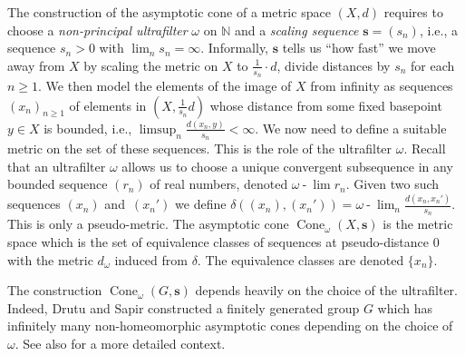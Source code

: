 \documentclass[12pt]{amsart}
\theoremstyle{definition}
\def\NN{\ensuremath{\mathbb{N}}}
\newcommand{\B}[1]{\mathbf{#1}}
\newcommand{\OP}[1]{\operatorname{#1}}
\def\omegalim{\omega\operatorname{-}\lim}
\def\Cone{\OP{Cone}}
\begin{document}
The construction of the asymptotic cone of a metric space $(X,d)$ requires to choose a {\em non-principal ultrafilter} $\omega$ on $\NN$ and a {\em scaling sequence} $\B s=(s_n)$, i.e., a sequence $s_n>0$ with $\lim_n s_n = \infty$.
Informally, $\B s$ tells us ``how fast'' we move away from $X$ by scaling the metric on $X$ to $\tfrac{1}{s_n} \cdot d$, divide distances by $s_n$ for each $n \geq 1$.
We then model the elements of the image of $X$ from infinity as sequences $(x_n)_{n \geq 1}$ of elements in $(X, \tfrac{1}{s_n}d)$ whose distance from some fixed basepoint $y \in X$ is bounded, i.e., $\limsup_n \tfrac{d(x_n,y)}{s_n} < \infty$.
We now need to define a suitable metric on the set of these sequences.
This is the role of the ultrafilter $\omega$.
Recall that an ultrafilter $\omega$ allows us to choose a unique convergent subsequence in any bounded sequence $(r_n)$ of real numbers, denoted $\omegalim r_n$.
Given two such sequences $(x_n)$ and~$(x_n')$ we define $\delta((x_n), (x_n')) = \omegalim_n \tfrac{d(x_n,x_n')}{s_n}$.
This is only a pseudo-metric.
The asymptotic cone $\Cone_\omega(X,\B s)$ is the metric space which is the set of equivalence classes of sequences at pseudo-distance $0$ with the metric $d_\omega$ induced from $\delta$.
The equivalence classes are denoted $\{ x_n \}$.

The construction  $\Cone_\omega(G,\B s)$ depends heavily on the choice of the ultrafilter.
Indeed, Drutu and Sapir \cite{MR2153979} constructed a finitely generated group $G$ which has infinitely many non-homeomorphic asymptotic cones depending on the choice of $\omega$.
See also \cite[page 189]{MR3753580} for a more detailed context. 
\end{document}
